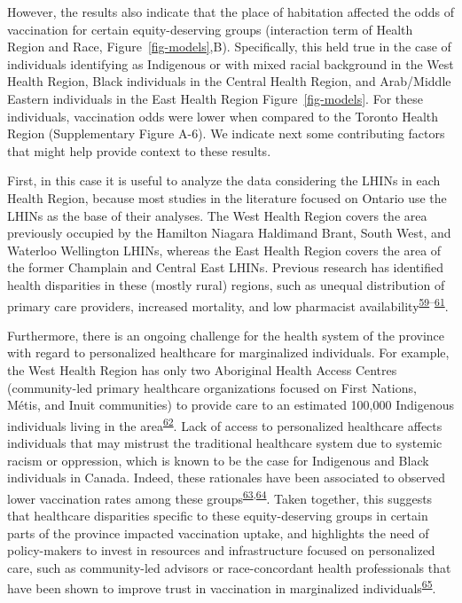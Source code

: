 \documentclass[
  letterpaper,
  DIV=11,
  numbers=noendperiod]{scrartcl}
\begin{document}
However, the results also indicate that the place of habitation affected
the odds of vaccination for certain equity-deserving groups (interaction
term of Health Region and Race, Figure~\ref{fig-models},B).
Specifically, this held true in the case of individuals identifying as
Indigenous or with mixed racial background in the West Health Region,
Black individuals in the Central Health Region, and Arab/Middle Eastern
individuals in the East Health Region Figure~\ref{fig-models}. For these
individuals, vaccination odds were lower when compared to the Toronto
Health Region (Supplementary Figure A-6). We indicate next some
contributing factors that might help provide context to these results.

First, in this case it is useful to analyze the data considering the
LHINs in each Health Region, because most studies in the literature
focused on Ontario use the LHINs as the base of their analyses. The West
Health Region covers the area previously occupied by the Hamilton
Niagara Haldimand Brant, South West, and Waterloo Wellington LHINs,
whereas the East Health Region covers the area of the former Champlain
and Central East LHINs. Previous research has identified health
disparities in these (mostly rural) regions, such as unequal
distribution of primary care providers, increased mortality, and low
pharmacist
availability\textsuperscript{\protect\hyperlink{ref-shah2019}{59}--\protect\hyperlink{ref-timony2022}{61}}.

Furthermore, there is an ongoing challenge for the health system of the
province with regard to personalized healthcare for marginalized
individuals. For example, the West Health Region has only two Aboriginal
Health Access Centres (community-led primary healthcare organizations
focused on First Nations, Métis, and Inuit communities) to provide care
to an estimated 100,000 Indigenous individuals living in the
area\textsuperscript{\protect\hyperlink{ref-ontariohealth}{62}}. Lack of
access to personalized healthcare affects individuals that may mistrust
the traditional healthcare system due to systemic racism or oppression,
which is known to be the case for Indigenous and Black individuals in
Canada. Indeed, these rationales have been associated to observed lower
vaccination rates among these
groups\textsuperscript{\protect\hyperlink{ref-smylie2022}{63},\protect\hyperlink{ref-eissa2021}{64}}.
Taken together, this suggests that healthcare disparities specific to
these equity-deserving groups in certain parts of the province impacted
vaccination uptake, and highlights the need of policy-makers to invest
in resources and infrastructure focused on personalized care, such as
community-led advisors or race-concordant health professionals that have
been shown to improve trust in vaccination in marginalized
individuals\textsuperscript{\protect\hyperlink{ref-schafferderoo2020}{65}}.
\end{document}
